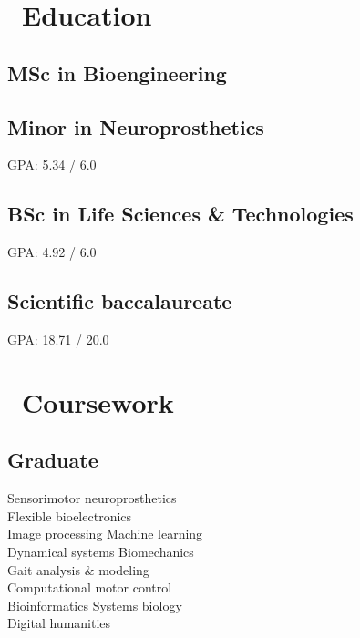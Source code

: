 \documentclass[a4paper]{cv}
\begin{document}
\begin{minipage}[t]{0.33\textwidth}

\section{\texorpdfstring{\faGraduationCap} \ \ Education}\sectionline

\subsection{MSc in Bioengineering}
\subsection{Minor in Neuroprosthetics}
GPA: 5.34 / 6.0
\sectionspace

\subsection{BSc in Life Sciences \& Technologies}
GPA: 4.92 / 6.0
\sectionspace

\subsection{Scientific baccalaureate}
GPA: 18.71 / 20.0
\sectionspace

\section{\texorpdfstring{\faBook} \ \ Coursework}\sectionline

\subsection{Graduate}
Sensorimotor neuroprosthetics\\
Flexible bioelectronics\\
Image processing \tbl{} Machine learning\\
Dynamical systems \tbl{} Biomechanics\\
Gait analysis \& modeling\\
Computational motor control\\
Bioinformatics \tbl{} Systems biology\\
Digital humanities
\sectionspace


\end{minipage}
\end{document}
